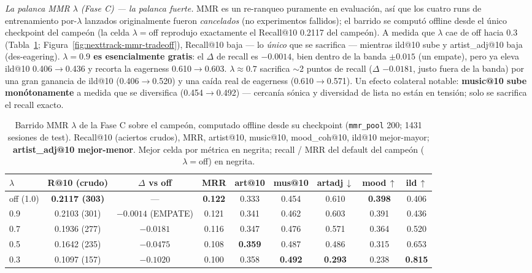 \documentclass[11pt]{article}
\newcommand{\best}[1]{\textbf{#1}}
\begin{document}
\emph{La palanca MMR $\lambda$ (Fase C) --- la palanca fuerte.} MMR es un re-ranqueo
puramente en evaluación, así que los cuatro runs de entrenamiento por-$\lambda$
lanzados originalmente fueron \emph{cancelados} (no experimentos fallidos); el barrido
se computó offline desde el único checkpoint del campeón (la celda $\lambda{=}$off
reprodujo exactamente el Recall@10 \num{0.2117} del campeón). A medida que $\lambda$ cae
de off hacia \num{0.3} (Tabla~\ref{tab:nexttrack-mmr-sweep}; Figura~\ref{fig:nexttrack-mmr-tradeoff}),
Recall@10 baja --- lo \emph{único} que se sacrifica --- mientras ild@10 sube y
artist\_adj@10 baja (des-eagering). \textbf{$\lambda{=}\num{0.9}$ es esencialmente
gratis}: el $\Delta$ de recall es $-\num{0.0014}$, bien dentro de la banda
$\pm\num{0.015}$ (un empate), pero ya eleva ild@10 \num{0.406}$\to$\num{0.436} y recorta
la eagerness \num{0.610}$\to$\num{0.603}. \textbf{$\lambda\approx\num{0.7}$} sacrifica
$\sim$2 puntos de recall ($\Delta$ $-\num{0.0181}$, justo fuera de la banda) por una
gran ganancia de ild@10 (\num{0.406}$\to$\num{0.520}) y una caída real de eagerness
(\num{0.610}$\to$\num{0.571}). Un efecto colateral notable: \textbf{music@10 sube
monótonamente} a medida que se diversifica (\num{0.454}$\to$\num{0.492}) --- cercanía
sónica y diversidad de lista no están en tensión; solo se sacrifica el recall exacto.

\begin{table}[ht]
  \centering
  \caption{Barrido MMR $\lambda$ de la Fase C sobre el campeón, computado offline desde
  su checkpoint (\texttt{mmr\_pool} \num{200}; \num{1431} sesiones de test). Recall@10
  (aciertos crudos), MRR, artist@10, music@10, mood\_coh@10, ild@10 mejor-mayor;
  \textbf{artist\_adj@10 mejor-menor}. Mejor celda por métrica en negrita; recall / MRR
  del default del campeón ($\lambda{=}$off) en negrita.}
  \label{tab:nexttrack-mmr-sweep}
  {\footnotesize\setlength{\tabcolsep}{4pt}\begin{tabular}{lcccccccc}
    \toprule
    $\lambda$ & R@10 (crudo) & $\Delta$ vs off & MRR & art@10 & mus@10 & artadj\,$\downarrow$ & mood\,$\uparrow$ & ild\,$\uparrow$ \\
    \midrule
    off (1.0) & \best{0.2117 (303)} & --- & \best{0.122} & 0.333 & 0.454 & 0.610 & \best{0.398} & 0.406 \\
    0.9 & 0.2103 (301) & $-0.0014$ (EMPATE) & 0.121 & 0.341 & 0.462 & 0.603 & 0.391 & 0.436 \\
    0.7 & 0.1936 (277) & $-0.0181$ & 0.116 & 0.347 & 0.476 & 0.571 & 0.364 & 0.520 \\
    0.5 & 0.1642 (235) & $-0.0475$ & 0.108 & \best{0.359} & 0.487 & 0.486 & 0.315 & 0.653 \\
    0.3 & 0.1097 (157) & $-0.1020$ & 0.100 & 0.358 & \best{0.492} & \best{0.293} & 0.238 & \best{0.815} \\
    \bottomrule
  \end{tabular}}
\end{table}
\end{document}
